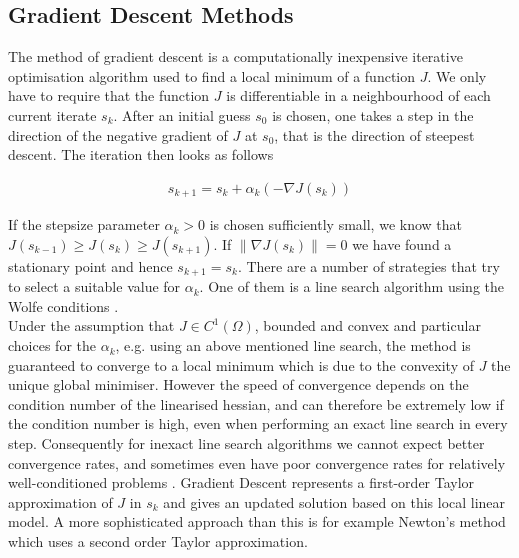 \documentclass[../draft_1.tex]{subfiles}
\begin{document}
\subsection{Gradient Descent Methods}
The method of gradient descent is a computationally inexpensive iterative optimisation algorithm used to find a local minimum of a function $J$. We only have to require that the function $J$ is differentiable in a neighbourhood of each current iterate $s_k$. After an initial guess $s_0$ is chosen, one takes a step in the direction of the negative gradient of $J$ at $s_0$, that is the direction of steepest descent. The iteration then looks as follows 
\begin{ceqn}
	\begin{align}
	s_{k+1} = s_k + \alpha_k (- \nabla J(s_k))
	\end{align}
\end{ceqn}
If the stepsize parameter $\alpha_k > 0 $ is chosen sufficiently small, we know that $J(s_{k-1}) \geq J(s_{k})  \geq J(s_{k+1})$. If $ \| \nabla J(s_k) \| = 0$ we have found a stationary point and hence $s_{k+1} = s_k$. There are a number of strategies that try to select a suitable value for $\alpha_k$. One of them is a line search algorithm using the Wolfe conditions \cite{NoceWrig99}.
\smallskip
\\
Under the assumption that $J \in C^1(\Omega)$, bounded and convex and particular choices for the $\alpha_k$, e.g. using an above mentioned line search, the method is guaranteed to converge to a local minimum which is due to the convexity of $J$ the unique global minimiser. However the speed of convergence depends on the condition number of the linearised hessian, and can therefore be extremely low if the condition number is high, even when performing an exact line search in every step. Consequently for inexact line search algorithms we cannot expect better convergence rates, and sometimes even have poor convergence rates for relatively well-conditioned problems \cite{NoceWrig99}. Gradient Descent represents a first-order Taylor approximation of $J$ in $s_k$ and gives an updated solution based on this local linear model. A more sophisticated approach than this is for example Newton's method which uses a second order Taylor approximation. 
\end{document}
